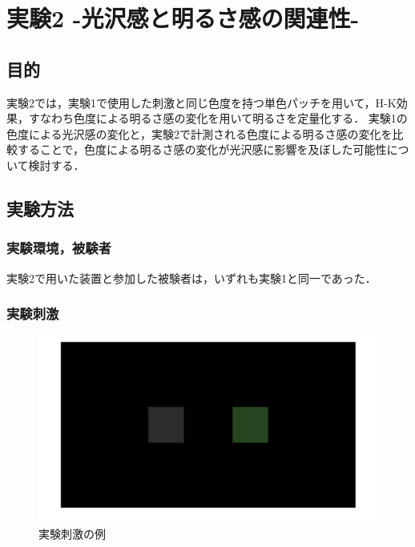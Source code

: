 \chapter{実験2 -光沢感と明るさ感の関連性-}

    \section{目的}

        実験2では，実験1で使用した刺激と同じ色度を持つ単色パッチを用いて，H-K効果，すなわち色度による明るさ感の変化を用いて明るさを定量化する．
        実験1の色度による光沢感の変化と，実験2で計測される色度による明るさ感の変化を比較することで，色度による明るさ感の変化が光沢感に影響を及ぼした可能性について検討する．


    \section{実験方法}
        \subsection{実験環境，被験者}

            実験2で用いた装置と参加した被験者は，いずれも実験1と同一であった．

        \subsection{実験刺激}

            \begin{figure}[h]
                \centering
                \includegraphics[width=14.0cm]{./img/ex2_stimuli2.png}
                \caption{実験刺激の例}
                \label{ex2_stimuli}
            \end{figure}

